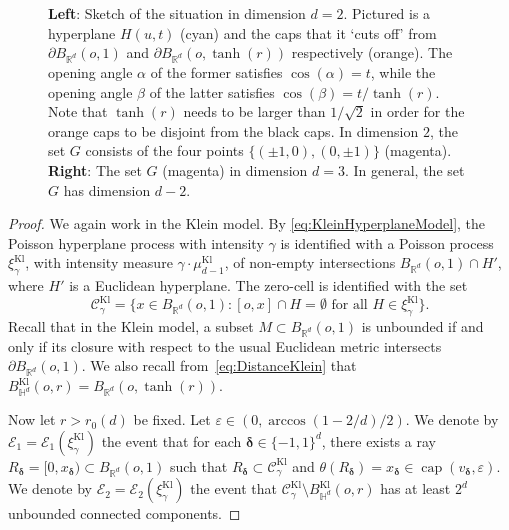 \documentclass[12pt,a4paper]{article}
\theoremstyle{definition}
\renewcommand{\H}{\mathbb{H}}
\newcommand{\R}{\mathbb{R}}
\DeclareMathOperator{\capop}{cap}
\begin{document}
\begin{figure}
\caption{\textbf{Left}: Sketch of the situation in dimension $d=2$.
Pictured is a hyperplane $H(u,t)$ (cyan) and the caps that it `cuts off' from $\partial B_{\R^d}(o,1)$ and $\partial B_{\R^d}(o,\tanh(r))$ respectively (orange).
The opening angle $\alpha$ of the former satisfies $\cos(\alpha) = t$, while the opening angle $\beta$ of the latter satisfies $\cos(\beta) = t/\tanh(r)$.
Note that $\tanh(r)$ needs to be larger than $1/\sqrt{2}$ in order for the orange caps to be disjoint from the black caps.
In dimension $2$, the set $G$ consists of the four points $\{(\pm 1,0),(0,\pm 1)\}$ (magenta).
\textbf{Right}: The set $G$ (magenta) in dimension $d=3$.
In general, the set $G$ has dimension $d-2$.
\label{fig:sketch_caps}}
\end{figure}
\begin{proof} We again work in the Klein model. By \eqref{eq:KleinHyperplaneModel}, the Poisson hyperplane process with intensity $\gamma$ is identified with a Poisson process $\xi_\gamma^\text{Kl}$, with intensity measure $\gamma \cdot \mu_{d-1}^\text{Kl}$, of non-empty intersections $B_{\R^d}(o,1) \cap H'$, where $H'$ is a Euclidean hyperplane. The zero-cell is identified with the set
$$
\mathcal{C}^\text{Kl}_\gamma = \{x \in B_{\R^d}(o,1) \colon \text{$[o,x] \cap H = \emptyset$ for all $H \in \xi_\gamma^\text{Kl}$}\}.
$$
Recall that in the Klein model, a subset $M \subset B_{\R^d}(o,1)$ is unbounded if and only if its closure with respect to the usual Euclidean metric intersects $\partial B_{\R^d}(o,1)$. We also recall from~\eqref{eq:DistanceKlein} that $B_{\H^d}^\text{Kl}(o,r) = B_{\R^d}(o,\tanh(r))$.

Now let $r>r_0(d)$ be fixed. Let $\varepsilon\in(0,\arccos(1-2/d)/2)$. We denote by $\mathcal{E}_1 = \mathcal{E}_1(\xi_\gamma^\text{Kl})$ the event that for each $\boldsymbol\delta \in \{-1,1\}^d$, there exists a ray $R_{\boldsymbol\delta} = [0,x_{\boldsymbol\delta}) \subset B_{\R^d}(o,1)$ such that $R_{\boldsymbol\delta} \subset \mathcal{C}_\gamma^\text{Kl}$ and $\theta(R_{\boldsymbol\delta}) =  x_{\boldsymbol\delta} \in \capop(v_{\boldsymbol\delta},\varepsilon)$. We denote by $\mathcal{E}_2=\mathcal{E}_2(\xi_\gamma^\text{Kl})$ the event that $\mathcal C^\text{Kl}_\gamma\setminus B_{\H^d}^\text{Kl}(o,r)$ has at least $2^d$ unbounded connected components. 


\end{proof}
\end{document}

